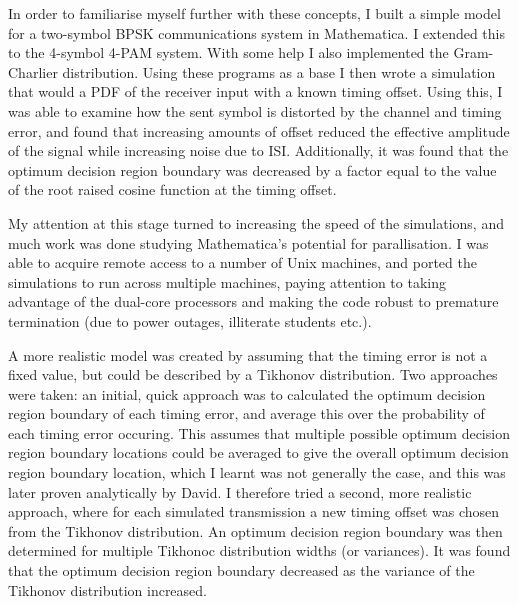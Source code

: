 In order to familiarise myself further with these concepts, I built a
simple model for a two-symbol BPSK communications system in Mathematica.
I extended this to the 4-symbol 4-PAM system. With some help I also
implemented the Gram-Charlier distribution. Using these programs as a
base I then wrote a simulation that would a PDF of the receiver input
with a known timing offset. Using this, I was able to examine how the
sent symbol is distorted by the channel and timing error, and found that
increasing amounts of offset reduced the effective amplitude of the
signal while increasing noise due to ISI. Additionally, it was found
that the optimum decision region boundary was decreased by a factor
equal to the value of the root raised cosine function at the timing
offset.

My attention at this stage turned to increasing the speed of the
simulations, and much work was done studying Mathematica's potential for
parallisation. I was able to acquire remote access to a number of Unix
machines, and ported the simulations to run across multiple machines,
paying attention to taking advantage of the dual-core processors and
making the code robust to premature termination (due to power outages,
illiterate students etc.).

A more realistic model was created by assuming that the timing error is
not a fixed value, but could be described by a Tikhonov distribution.
Two approaches were taken: an initial, quick approach was to calculated
the optimum decision region boundary of each timing error, and average
this over the probability of each timing error occuring. This assumes
that multiple possible optimum decision region boundary locations could
be averaged to give the overall optimum decision region boundary
location, which I learnt was not generally the case, and this was later
proven analytically by David. I therefore tried a second, more realistic
approach, where for each simulated transmission a new timing offset was
chosen from the Tikhonov distribution. An optimum decision region
boundary was then determined for multiple Tikhonoc distribution widths
(or variances). It was found that the optimum decision region boundary
decreased as the variance of the Tikhonov distribution increased.

